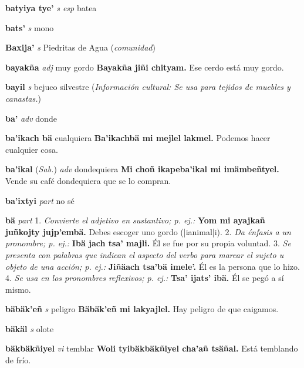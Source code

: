 \documentclass[10pt]{scrbook}
\newcommand{\entry}[1]{\textbf{#1}}
\newcommand{\onedefinition}[1]{#1.}
\newcommand{\nontranslationdef}[1]{\textit{#1}}
\newcommand{\partofspeech}[1]{\textit{#1}}
\newcommand{\spanishtranslation}[1]{#1}
\newcommand{\clarification}[1]{(\textit{#1})}
\newcommand{\cholexample}[1]{\textbf{#1}}
\newcommand{\exampletranslation}[1]{#1}
\newcommand{\relevantdialect}[1]{(\textit{#1})}
\newcommand{\culturalinformation}[1]{(\textit{#1})}
\begin{document}
\begin{multicols}{2}
\entry{batyiya tye'}
\partofspeech{s esp}
\spanishtranslation{batea}

\entry{bats'}
\partofspeech{s}
\spanishtranslation{mono}

\entry{Baxija'}
\partofspeech{s}
\spanishtranslation{Piedritas de Agua}
\clarification{comunidad}

\entry{bayakña}
\partofspeech{adj}
\spanishtranslation{muy gordo}
\cholexample{Bayakña jiñi chityam.}
\exampletranslation{Ese cerdo está muy gordo.}

\entry{bayil}
\partofspeech{s}
\spanishtranslation{bejuco silvestre}
\culturalinformation{Información cultural: Se usa para tejidos de muebles y canastas.}

\entry{ba'}
\partofspeech{adv}
\spanishtranslation{donde}

\entry{ba'ikach bä}
\spanishtranslation{cualquiera}
\cholexample{Ba'ikachbä mi mejlel lakmel.}
\exampletranslation{Podemos hacer cualquier cosa.}

\entry{ba'ikal}
\relevantdialect{Sab.}
\partofspeech{adv}
\spanishtranslation{dondequiera}
\cholexample{Mi choñ ikapeba'ikal mi imämbeñtyel.}
\exampletranslation{Vende su café dondequiera que se lo compran.}

\entry{ba'ixtyi}
\partofspeech{part}
\spanishtranslation{no sé}

\entry{bä}
\partofspeech{part}
\onedefinition{1}
\nontranslationdef{Convierte el adjetivo en sustantivo; p. ej.:}
\cholexample{Yom mi ayajkañ juñkojty jujp'embä.}
\exampletranslation{Debes escoger uno gordo (|ianimal|i).}
\onedefinition{2}
\nontranslationdef{Da énfasis a un pronombre; p. ej.:}
\cholexample{Ibä jach tsa' majli.}
\exampletranslation{Él se fue por su propia voluntad.}
\onedefinition{3}
\nontranslationdef{Se presenta con palabras que indican el aspecto del verbo para marcar el sujeto u objeto de una acción; p. ej.:}
\cholexample{Jiñäach tsa'bä imele'.}
\exampletranslation{Él es la persona que lo hizo.}
\onedefinition{4}
\nontranslationdef{Se usa en los pronombres reflexivos; p. ej.:}
\cholexample{Tsa' ijats' ibä.}
\exampletranslation{Él se pegó a sí mismo.}

\entry{bäbäk'eñ}
\partofspeech{s}
\spanishtranslation{peligro}
\cholexample{Bäbäk'eñ mi lakyajlel.}
\exampletranslation{Hay peligro de que caigamos.}

\entry{bäkäl}
\partofspeech{s}
\spanishtranslation{olote}

\entry{bäkbäkñiyel}
\partofspeech{vi}
\spanishtranslation{temblar}
\cholexample{Woli tyibäkbäkñiyel cha'añ tsäñal.}
\exampletranslation{Está temblando de frío.}


\end{multicols}
\end{document}
